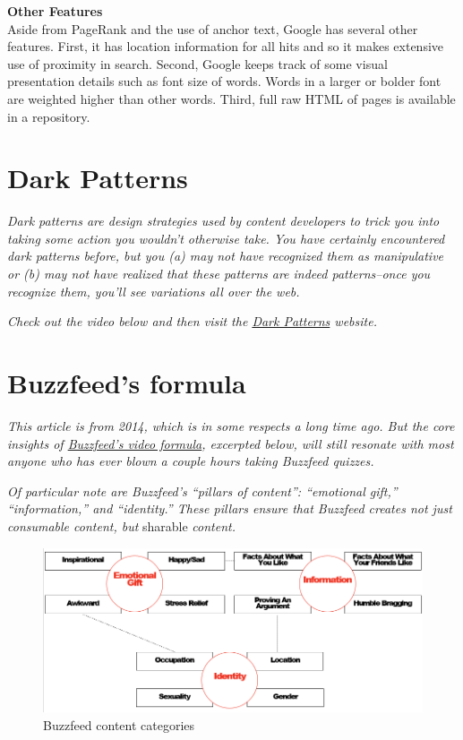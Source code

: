 \documentclass[]{book}
\theoremstyle{definition}
\theoremstyle{definition}
\theoremstyle{definition}
\theoremstyle{remark}
\begin{document}
\textbf{Other Features}\\
Aside from PageRank and the use of anchor text, Google has several other
features. First, it has location information for all hits and so it
makes extensive use of proximity in search. Second, Google keeps track
of some visual presentation details such as font size of words. Words in
a larger or bolder font are weighted higher than other words. Third,
full raw HTML of pages is available in a repository.

\hypertarget{dark-patterns}{%
\section{Dark Patterns}\label{dark-patterns}}

\emph{Dark patterns are design strategies used by content developers to
trick you into taking some action you wouldn't otherwise take. You have
certainly encountered dark patterns before, but you (a) may not have
recognized them as manipulative or (b) may not have realized that these
patterns are indeed patterns--once you recognize them, you'll see
variations all over the web.}

\emph{Check out the video below and then visit the
\href{https://darkpatterns.org/}{Dark Patterns} website.}

\hypertarget{buzzfeeds-formula}{%
\section{Buzzfeed's formula}\label{buzzfeeds-formula}}

\emph{This article is from 2014, which is in some respects a long time
ago. But the core insights of
\href{http://tubularinsights.com/buzzfeed-video-formula/}{Buzzfeed's
video formula}, excerpted below, will still resonate with most anyone
who has ever blown a couple hours taking Buzzfeed quizzes.}

\emph{Of particular note are Buzzfeed's ``pillars of content'':
``emotional gift,'' ``information,'' and ``identity.'' These pillars
ensure that Buzzfeed creates not just consumable content, but } sharable
\emph{content.}

\begin{figure}
\centering
\includegraphics{buzzfeed-content-categories.png}
\caption{Buzzfeed content categories}
\end{figure}
\end{document}
